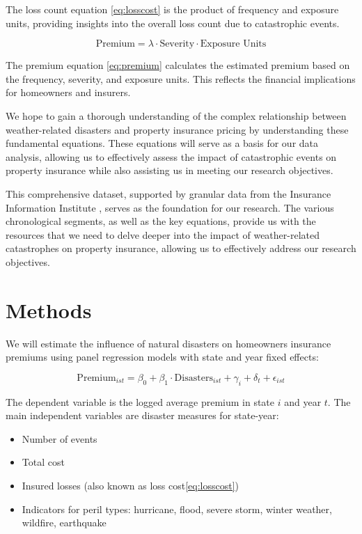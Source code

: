 \documentclass[12pt]{article}
\begin{document}
The loss count equation \ref{eq:losscost} is the product of frequency and exposure units, providing insights into the overall loss count due to catastrophic events.

\begin{equation}
    \label{eq:premium}
    \text{Premium} = \lambda \cdot \text{Severity} \cdot \text{Exposure Units}
\end{equation}

The premium equation \ref{eq:premium} calculates the estimated premium based on the frequency, severity, and exposure units. This 
reflects the financial implications for homeowners and insurers.

We hope to gain a thorough understanding of the complex relationship between weather-related disasters and property insurance pricing 
by understanding these fundamental equations. These equations will serve as a basis for our data analysis, allowing us to effectively 
assess the impact of catastrophic events on property insurance while also assisting us in meeting our research objectives.

This comprehensive dataset, supported by granular data from the Insurance Information Institute \cite{iii}, serves as the foundation 
for our research. The various chronological segments, as well as the key equations, provide us with the resources that we need to 
delve deeper into the impact of weather-related catastrophes on property insurance, allowing us to effectively address our research 
objectives. 



\section{Methods}
\label{sec:meth}
We will estimate the influence of natural disasters on homeowners insurance premiums using panel regression models with state and year 
fixed effects:

\begin{equation} 
    \mathrm{Premium}_{ist} = \beta_0 + \beta_1 \cdot \mathrm{Disasters}_{ist} + \gamma_i + \delta_t + \epsilon_{ist}
\end{equation}

The dependent variable is the logged average premium in state $i$ and year $t$. The main independent variables are disaster measures 
for state-year:

\begin{itemize} 
    \item Number of events 
    \item Total cost 
    \item Insured losses (also known as loss cost\ref{eq:losscost})
    \item Indicators for peril types: hurricane, flood, severe storm, winter weather, wildfire, earthquake 
\end{itemize}
\end{document}
